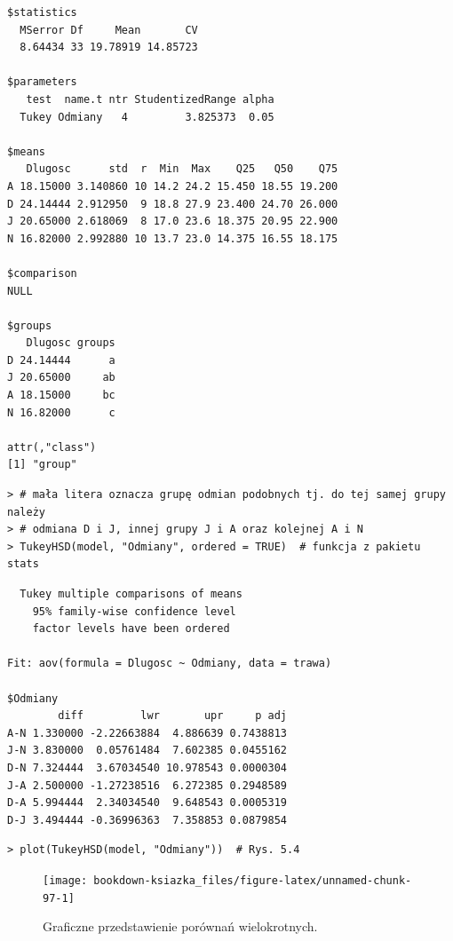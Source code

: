 \documentclass[12pt,B5paper,]{book}
\begin{document}
\begin{verbatim}
$statistics
  MSerror Df     Mean       CV
  8.64434 33 19.78919 14.85723

$parameters
   test  name.t ntr StudentizedRange alpha
  Tukey Odmiany   4         3.825373  0.05

$means
   Dlugosc      std  r  Min  Max    Q25   Q50    Q75
A 18.15000 3.140860 10 14.2 24.2 15.450 18.55 19.200
D 24.14444 2.912950  9 18.8 27.9 23.400 24.70 26.000
J 20.65000 2.618069  8 17.0 23.6 18.375 20.95 22.900
N 16.82000 2.992880 10 13.7 23.0 14.375 16.55 18.175

$comparison
NULL

$groups
   Dlugosc groups
D 24.14444      a
J 20.65000     ab
A 18.15000     bc
N 16.82000      c

attr(,"class")
[1] "group"
\end{verbatim}

\begin{verbatim}
> # mała litera oznacza grupę odmian podobnych tj. do tej samej grupy należy
> # odmiana D i J, innej grupy J i A oraz kolejnej A i N
> TukeyHSD(model, "Odmiany", ordered = TRUE)  # funkcja z pakietu stats
\end{verbatim}

\begin{verbatim}
  Tukey multiple comparisons of means
    95% family-wise confidence level
    factor levels have been ordered

Fit: aov(formula = Dlugosc ~ Odmiany, data = trawa)

$Odmiany
        diff         lwr       upr     p adj
A-N 1.330000 -2.22663884  4.886639 0.7438813
J-N 3.830000  0.05761484  7.602385 0.0455162
D-N 7.324444  3.67034540 10.978543 0.0000304
J-A 2.500000 -1.27238516  6.272385 0.2948589
D-A 5.994444  2.34034540  9.648543 0.0005319
D-J 3.494444 -0.36996363  7.358853 0.0879854
\end{verbatim}

\begin{verbatim}
> plot(TukeyHSD(model, "Odmiany"))  # Rys. 5.4
\end{verbatim}

\begin{figure}[H]

{\centering \texttt{[image: bookdown-ksiazka\_files/figure-latex/unnamed-chunk-97-1]} 

}

\caption{Graficzne przedstawienie porównań wielokrotnych.}\label{fig:unnamed-chunk-97}
\end{figure}
\end{document}
